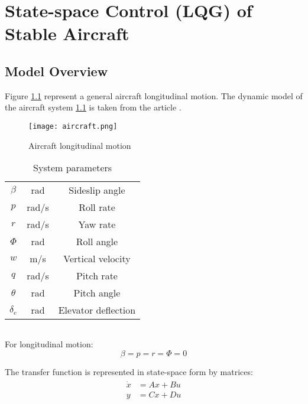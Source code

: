 \chapter{State-space Control (LQG) of Stable Aircraft}
\section{Model Overview}
Figure \ref{fig:aircraft} represent a general aircraft longitudinal motion.
The dynamic model of the aircraft system \ref{fig:aircraft} is taken from
the article \cite{air_lqg}.

\begin{figure}[h]
    \centering
    \texttt{[image: aircraft.png]}
    \caption{Aircraft longitudinal motion}
    \label{fig:aircraft}
\end{figure}


\begin{table}[h]
    \centering
    \begin{tabular}{|c|c|c|}
        \hline
        $\beta$     & rad         & Sideslip angle \\
        $p$         & rad/s       & Roll rate\\
        $r$         & rad/s       & Yaw rate\\
        $\Phi$      & rad         & Roll angle\\
        $w$         & m/s         & Vertical velocity\\
        $q$         & rad/s       & Pitch rate\\
        $\theta$    & rad         & Pitch angle\\
        $\delta_e$  & rad         & Elevator deflection\\
        \hline
    \end{tabular}
    \caption{System parameters}
    \label{tab:params}
\end{table}

\begin{tabular}{ |c|c| }
    \hline
    \hline
\end{tabular}

For longitudinal motion:
\begin{equation}
    \beta = p = r =\Phi = 0
\end{equation}

The transfer function is represented in state-space form by matrices:
\begin{align} \label{sys_ss}
    \begin{split}
        \dot{x} &= Ax + Bu \\
        y &= Cx + Du
    \end{split}
\end{align}

